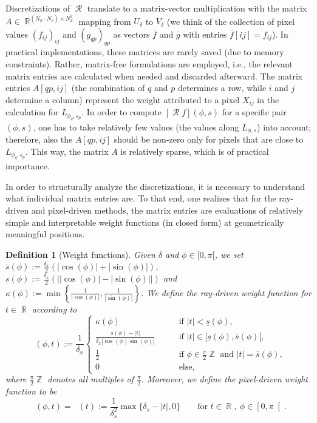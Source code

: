 \documentclass[11pt,reqno]{amsart}
\DeclareMathOperator{\RR}{\mathbb{R}}
\DeclareMathOperator{\ZZ}{\mathbb{Z}}
\DeclareMathOperator{\Radon}{\mathcal{R}}
\DeclareMathOperator{\RayWeight}{\omega^\mathrm{rd}_{\delta_\mathit{x}}}
\DeclareMathOperator{\PixelWeight}{\omega^\mathrm{pd}_{\delta_\mathit{s}}}
\numberwithin{theorem}{section}
\newtheorem{definition}[theorem]{Definition}
\theoremstyle{remark}
\begin{document}
Discretizations of $\Radon$ translate to a matrix-vector multiplication with the matrix $A\in \RR^{ (N_\phi \cdot N_s) \times N_x^2 }$ mapping from $U_\delta$ to $V_\delta$ (we think of the collection of pixel values $(f_{ij})_{ij}$ and $(g_{qp})_{qp}$ as vectors $\overline f$ and $\overline g$ with entries $\overline f [ij]=f_{ij}$). In practical implementations, these matrices are rarely saved (due to memory constraints). Rather, matrix-free formulations are employed, i.e., the relevant matrix entries are calculated when needed and discarded afterward. 
The matrix entries $A[qp,ij]$ (the combination of $q$ and $p$ determines a row, while $i$ and $j$ determine a column) represent the weight attributed to a pixel $X_{ij}$ in the calculation for $L_{\phi_q,s_p}$. In order to compute $[\Radon f](\phi,s)$ for a specific pair $(\phi,s)$, one has to take relatively few values (the values along $L_{\phi,s}$) into account; therefore, also the $A[qp,ij]$ should be non-zero only for pixels that are close to $L_{\phi_q,s_p}$. This way, the matrix $A$ is relatively sparse, which is of practical importance.

In order to structurally analyze the discretizations, it is necessary to understand what individual matrix entries are. To that end, one realizes that for the ray-driven and pixel-driven methods, the matrix entries are evaluations of relatively simple and interpretable weight functions (in closed form) at geometrically meaningful positions.
\begin{definition}[Weight functions]
Given $\delta$ and $\phi\in [0,\pi[$, we set\\ $\overline s(\phi) := \frac{\delta_x}{2} (| \cos(\phi)|+| \sin(\phi)|)$, $\underline s(\phi) := \frac{\delta_x}{2} (\big | |\cos(\phi)|- |\sin(\phi)|\big|)$ and   $\kappa(\phi) :=  \min \left\{\frac{1}{|\cos(\phi)|},\frac{1}{|\sin(\phi)|}\right\}$. We define the ray-driven weight function for $t\in \RR$ according to
\begin{equation}\label{equ_def_ray_weight}
\RayWeight(\phi,t):= \frac{1}{\delta_x}
\begin{cases} 
\kappa(\phi) \qquad &\text{if } |t| <\underline s(\phi),
\\
 \frac{\overline s(\phi)-|t|}{\delta_x|\cos(\phi)\sin(\phi)|} \qquad & \text{if } |t| \in [\underline s(\phi),\overline s(\phi)[,
\\
\frac{1}{2} \qquad & \text{if } \phi\in \frac{\pi}{2}\ZZ \text{ and } |t| =\overline s (\phi),
\\
0 & \text{else},	
\end{cases}
\end{equation}
where $\frac{\pi}{2}\ZZ$ denotes all multiples of $\frac{\pi}{2}$. 
Moreover, we define the pixel-driven weight function to be
\begin{equation}\label{equ_def_pixel_weight}
\PixelWeight(\phi,t)=\PixelWeight(t):= \frac{1}{\delta_s^2} \max\{\delta_s-|t|,0\} \qquad \text{for } t\in \RR, \  \phi\in \left [0,\pi\right[.
\end{equation}
\end{definition}
\end{document}
